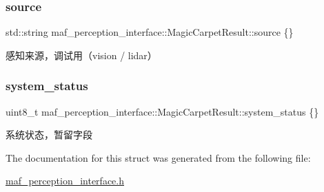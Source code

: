 \subsubsection{\texorpdfstring{source}{source}}
{\footnotesize\ttfamily std\+::string maf\+\_\+perception\+\_\+interface\+::\+Magic\+Carpet\+Result\+::source \{\}}



感知来源，调试用（vision / lidar） 

\mbox{\label{structmaf__perception__interface_1_1MagicCarpetResult_a8738b1fec8887d0605a082d396328b38}} 
\subsubsection{\texorpdfstring{system\+\_\+status}{system\_status}}
{\footnotesize\ttfamily uint8\+\_\+t maf\+\_\+perception\+\_\+interface\+::\+Magic\+Carpet\+Result\+::system\+\_\+status \{\}}



系统状态，暂留字段 



The documentation for this struct was generated from the following file\+:\begin{DoxyCompactItemize}
\item 
\hyperlink{maf__perception__interface_8h}{maf\+\_\+perception\+\_\+interface.\+h}\end{DoxyCompactItemize}
